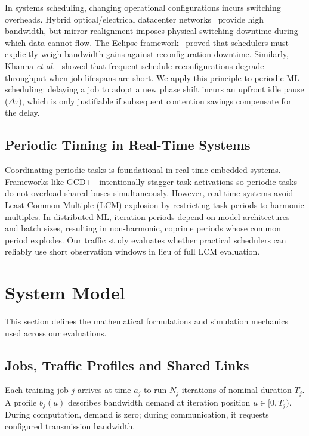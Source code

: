 \documentclass[conference]{IEEEtran}
\begin{document}
In systems scheduling, changing operational configurations incurs switching overheads. Hybrid optical/electrical datacenter networks~\cite{helios,cthrough} provide high bandwidth, but mirror realignment imposes physical switching downtime during which data cannot flow. The Eclipse framework~\cite{eclipse} proved that schedulers must explicitly weigh bandwidth gains against reconfiguration downtime. Similarly, Khanna \emph{et al.}~\cite{khanna2017} showed that frequent schedule reconfigurations degrade throughput when job lifespans are short. We apply this principle to periodic ML scheduling: delaying a job to adopt a new phase shift incurs an upfront idle pause ($\Delta \tau$), which is only justifiable if subsequent contention savings compensate for the delay.

\subsection{Periodic Timing in Real-Time Systems}

Coordinating periodic tasks is foundational in real-time embedded systems. Frameworks like GCD+~\cite{gcdplus} intentionally stagger task activations so periodic tasks do not overload shared buses simultaneously. However, real-time systems avoid Least Common Multiple (LCM) explosion by restricting task periods to harmonic multiples. In distributed ML, iteration periods depend on model architectures and batch sizes, resulting in non-harmonic, coprime periods whose common period explodes. Our traffic study evaluates whether practical schedulers can reliably use short observation windows in lieu of full LCM evaluation.

\section{System Model}
\label{sec:system-model}

This section defines the mathematical formulations and simulation mechanics used across our evaluations.

\subsection{Jobs, Traffic Profiles and Shared Links}

Each training job $j$ arrives at time $a_j$ to run $N_j$ iterations of nominal duration $T_j$. A profile $b_j(u)$ describes bandwidth demand at iteration position $u \in [0, T_j)$. During computation, demand is zero; during communication, it requests configured transmission bandwidth.
\end{document}
